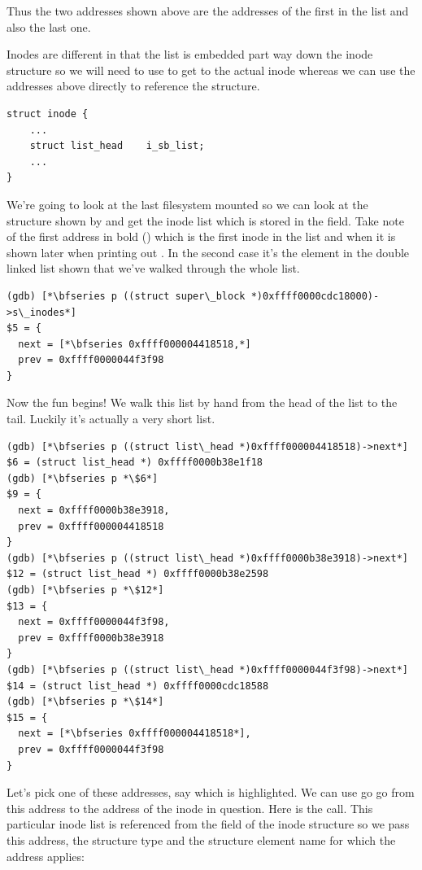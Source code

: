 \noindent
Thus the two addresses shown above are the addresses of the first  in the list and also the last one.

Inodes are different in that the list is embedded part way down the inode structure so we will need to use  to get to the actual inode whereas we can use the addresses above directly to reference the  structure.

\begin{lstlisting}
struct inode {
    ...
    struct list_head    i_sb_list;
    ...
}
\end{lstlisting}

\noindent
We're going to look at the last filesystem mounted so we can look at the  structure shown by  and get the inode list which is stored in the  field. Take note of the first address in bold () which is the first inode in the list and when it is shown later when printing out . In the second case it's the  element in the double linked list shown that we've walked through the whole list.

\begin{lstlisting}
(gdb) [*\bfseries p ((struct super\_block *)0xffff0000cdc18000)->s\_inodes*]
$5 = {
  next = [*\bfseries 0xffff000004418518,*]
  prev = 0xffff0000044f3f98
}
\end{lstlisting}

\noindent
Now the fun begins! We walk this list by hand from the head of the list to the tail. Luckily it's actually a very short list.

\begin{lstlisting}
(gdb) [*\bfseries p ((struct list\_head *)0xffff000004418518)->next*]
$6 = (struct list_head *) 0xffff0000b38e1f18
(gdb) [*\bfseries p *\$6*]
$9 = {
  next = 0xffff0000b38e3918,
  prev = 0xffff000004418518
}
(gdb) [*\bfseries p ((struct list\_head *)0xffff0000b38e3918)->next*]
$12 = (struct list_head *) 0xffff0000b38e2598
(gdb) [*\bfseries p *\$12*]
$13 = {
  next = 0xffff0000044f3f98,
  prev = 0xffff0000b38e3918
}
(gdb) [*\bfseries p ((struct list\_head *)0xffff0000044f3f98)->next*]
$14 = (struct list_head *) 0xffff0000cdc18588
(gdb) [*\bfseries p *\$14*]
$15 = {
  next = [*\bfseries 0xffff000004418518*],
  prev = 0xffff0000044f3f98
}
\end{lstlisting}

\noindent
Let's pick one of these addresses, say  which is highlighted. We can use  go go from this address to the address of the inode in question. Here is the call. This particular inode list is referenced from the  field of the inode structure so we pass this address, the structure type and the structure element name for which the address applies:


